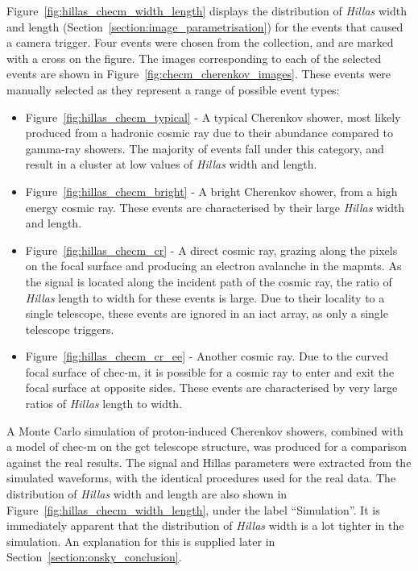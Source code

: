 Figure~\ref{fig:hillas_checm_width_length} displays the distribution of \textit{Hillas} width and length (Section~\ref{section:image_parametrisation}) for the events that caused a camera trigger. Four events were chosen from the collection, and are marked with a cross on the figure. The images corresponding to each of the selected events are shown in Figure~\ref{fig:checm_cherenkov_images}. These events were manually selected as they represent a range of possible event types:
\begin{itemize}
\item Figure~\ref{fig:hillas_checm_typical} - A typical Cherenkov shower, most likely produced from a hadronic cosmic ray due to their abundance compared to gamma-ray showers. The majority of events fall under this category, and result in a cluster at low values of \textit{Hillas} width and length.
\item Figure~\ref{fig:hillas_checm_bright} - A bright Cherenkov shower, from a high energy cosmic ray. These events are characterised by their large \textit{Hillas} width and length. 
\item Figure~\ref{fig:hillas_checm_cr} - A direct cosmic ray, grazing along the pixels on the focal surface and producing an electron avalanche in the \glspl{mapmt}. As the signal is located along the incident path of the cosmic ray, the ratio of \textit{Hillas} length to width for these events is large. Due to their locality to a single telescope, these events are ignored in an \gls{iact} array, as only a single telescope triggers.
\item Figure~\ref{fig:hillas_checm_cr_ee} - Another cosmic ray. Due to the curved focal surface of \gls{chec-m}, it is possible for a cosmic ray to enter and exit the focal surface at opposite sides. These events are characterised by very large ratios of \textit{Hillas} length to width.
\end{itemize}

A Monte Carlo simulation of proton-induced Cherenkov showers, combined with a model of \gls{chec-m} on the \gls{gct} telescope structure, was produced for a comparison against the real results. The signal and Hillas parameters were extracted from the simulated waveforms, with the identical procedures used for the real data. The distribution of \textit{Hillas} width and length are also shown in Figure~\ref{fig:hillas_checm_width_length}, under the label ``Simulation''. It is immediately apparent that the distribution of \textit{Hillas} width is a lot tighter in the simulation. An explanation for this is supplied later in Section~\ref{section:onsky_conclusion}.

